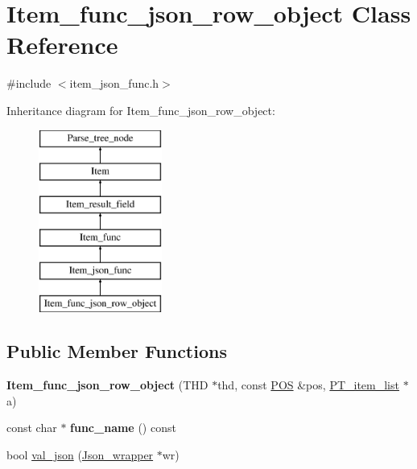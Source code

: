 \hypertarget{classItem__func__json__row__object}{}\section{Item\+\_\+func\+\_\+json\+\_\+row\+\_\+object Class Reference}
\label{classItem__func__json__row__object}


{\ttfamily \#include $<$item\+\_\+json\+\_\+func.\+h$>$}

Inheritance diagram for Item\+\_\+func\+\_\+json\+\_\+row\+\_\+object\+:\begin{figure}[H]
\begin{center}
\leavevmode
\includegraphics[height=6.000000cm]{classItem__func__json__row__object}
\end{center}
\end{figure}
\subsection*{Public Member Functions}
\begin{DoxyCompactItemize}
\item 
\mbox{\label{classItem__func__json__row__object_ad74b0af880b223a641682b71fd87de63}} 
{\bfseries Item\+\_\+func\+\_\+json\+\_\+row\+\_\+object} (T\+HD $\ast$thd, const \mbox{\hyperlink{structYYLTYPE}{P\+OS}} \&pos, \mbox{\hyperlink{classPT__item__list}{P\+T\+\_\+item\+\_\+list}} $\ast$a)
\item 
\mbox{\label{classItem__func__json__row__object_a6f1f6ed33a33a6f361a3fefedf7e600e}} 
const char $\ast$ {\bfseries func\+\_\+name} () const
\item 
bool \mbox{\hyperlink{classItem__func__json__row__object_ac325e6707cbb0d96b06b8695ca05f228}{val\+\_\+json}} (\mbox{\hyperlink{classJson__wrapper}{Json\+\_\+wrapper}} $\ast$wr)
\end{DoxyCompactItemize}
